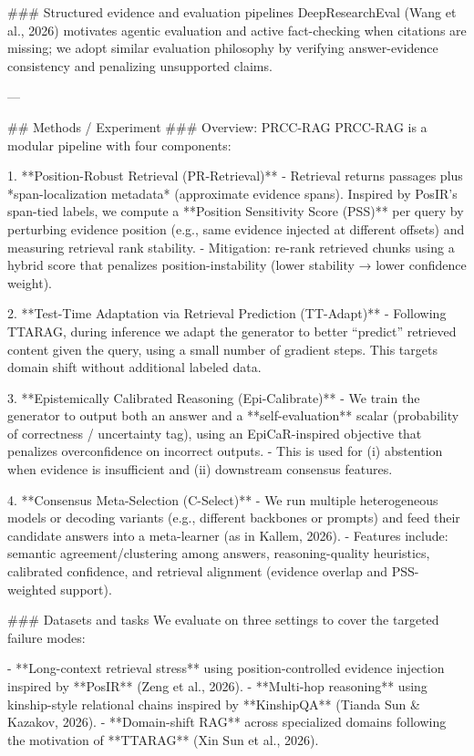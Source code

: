 ### Structured evidence and evaluation pipelines  
DeepResearchEval (Wang et al., 2026) motivates agentic evaluation and active fact-checking when citations are missing; we adopt similar evaluation philosophy by verifying answer-evidence consistency and penalizing unsupported claims.

---

## Methods / Experiment  
### Overview: PRCC-RAG  
PRCC-RAG is a modular pipeline with four components:

1. **Position-Robust Retrieval (PR-Retrieval)**  
   - Retrieval returns passages plus *span-localization metadata* (approximate evidence spans). Inspired by PosIR’s span-tied labels, we compute a **Position Sensitivity Score (PSS)** per query by perturbing evidence position (e.g., same evidence injected at different offsets) and measuring retrieval rank stability.
   - Mitigation: re-rank retrieved chunks using a hybrid score that penalizes position-instability (lower stability → lower confidence weight).

2. **Test-Time Adaptation via Retrieval Prediction (TT-Adapt)**  
   - Following TTARAG, during inference we adapt the generator to better “predict” retrieved content given the query, using a small number of gradient steps. This targets domain shift without additional labeled data.

3. **Epistemically Calibrated Reasoning (Epi-Calibrate)**  
   - We train the generator to output both an answer and a **self-evaluation** scalar (probability of correctness / uncertainty tag), using an EpiCaR-inspired objective that penalizes overconfidence on incorrect outputs.
   - This is used for (i) abstention when evidence is insufficient and (ii) downstream consensus features.

4. **Consensus Meta-Selection (C-Select)**  
   - We run multiple heterogeneous models or decoding variants (e.g., different backbones or prompts) and feed their candidate answers into a meta-learner (as in Kallem, 2026).
   - Features include: semantic agreement/clustering among answers, reasoning-quality heuristics, calibrated confidence, and retrieval alignment (evidence overlap and PSS-weighted support).

### Datasets and tasks  
We evaluate on three settings to cover the targeted failure modes:

- **Long-context retrieval stress** using position-controlled evidence injection inspired by **PosIR** (Zeng et al., 2026).  
- **Multi-hop reasoning** using kinship-style relational chains inspired by **KinshipQA** (Tianda Sun & Kazakov, 2026).  
- **Domain-shift RAG** across specialized domains following the motivation of **TTARAG** (Xin Sun et al., 2026).

